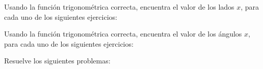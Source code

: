 \documentclass[12pt,addpoints,answers]{evalua}
\begin{document}
\begin{questions}
    \question[] Usando la función trigonométrica correcta, encuentra el valor de los lados $x$, para cada uno de los siguientes ejercicios:

    \begin{multicols}{2}
    \end{multicols}

    \question[] Usando la función trigonométrica correcta, encuentra el valor de los ángulos $x$, para cada uno de los siguientes ejercicios:

    \begin{multicols}{2}
    \end{multicols}

    \question[] Resuelve los siguientes problemas:

    \begin{multicols}{2}
\end{multicols}
\end{questions}
\end{document}
